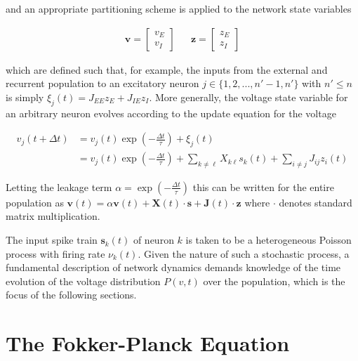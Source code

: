 \documentclass{ucetd}
\begin{document}
and an appropriate partitioning scheme is applied to the network state variables

\begin{align}
\mathbf{v} = \begin{bmatrix}
    v_{E}\\
    v_{I} 
\end{bmatrix}  && \mathbf{z} = \begin{bmatrix}
    z_{E}\\
    z_{I} 
\end{bmatrix} 
\end{align}

which are defined such that, for example, the inputs from the external and recurrent population to an excitatory neuron $j \in \{1, 2, ..., n'-1, n'\}$ with $n' \leq n$ is simply $\xi_{j}(t) = J_{EE}z_{E} + J_{IE}z_{I}$. More generally, the voltage state variable for an arbitrary neuron evolves according to the update equation for the voltage 

\begin{align*}
v_{j}(t+\Delta t) &= v_{j}(t)\exp\left(-\frac{\Delta t}{\tau}\right) + \xi_{j}(t)\\
&= v_{j}(t)\exp\left(-\frac{\Delta t}{\tau}\right) + \sum_{k\neq \ell}X_{k\ell}s_{k}(t) + \sum_{i\neq j} J_{ij}z_{i}(t)
\end{align*}

Letting the leakage term $\alpha = \exp\left(-\frac{\Delta t}{\tau}\right)$ this can be written for the entire population as $\mathbf{v}(t) = \alpha\mathbf{v}(t) + \mathbf{X}(t)\cdot \mathbf{s} + \mathbf{J}(t)\cdot \mathbf{z}$ where $\cdot$ denotes standard matrix multiplication. 

The input spike train $\mathbf{s}_{k}(t)$ of neuron $k$ is taken to be a heterogeneous Poisson process with firing rate $\nu_{k}(t)$. Given the nature of such a stochastic process, a fundamental description of network dynamics demands knowledge of the time evolution of the voltage distribution $P(v,t)$ over the population, which is the focus of the following sections.

\section{The Fokker-Planck Equation}
\end{document}

